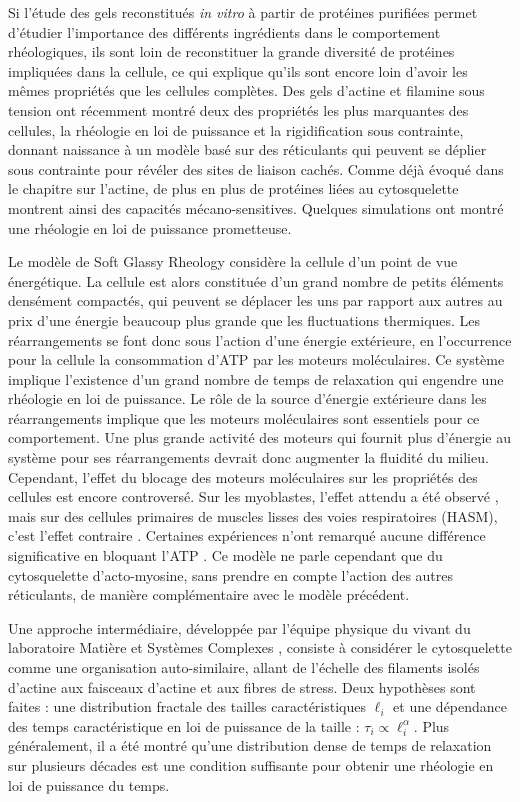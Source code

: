 \documentclass{report}
\begin{document}
Si l'étude des gels reconstitués \textit{in vitro} à partir de protéines purifiées permet d'étudier l'importance des différents ingrédients dans le comportement rhéologiques, ils sont loin de reconstituer la grande diversité de protéines impliquées dans la cellule, ce qui explique qu'ils sont encore loin d'avoir les mêmes propriétés que les cellules complètes. 
Des gels d'actine et filamine sous tension ont récemment montré deux des propriétés les plus marquantes des cellules, la rhéologie en loi de puissance et la rigidification sous contrainte, donnant naissance à un modèle basé sur des réticulants qui peuvent se déplier sous contrainte pour révéler des sites de liaison cachés. Comme déjà évoqué dans le chapitre sur l'actine, de plus en plus de protéines liées au cytosquelette montrent ainsi des capacités mécano-sensitives. Quelques simulations ont montré une rhéologie en loi de puissance prometteuse. 

Le modèle de Soft Glassy Rheology \cite{sollich} considère la cellule d'un point de vue énergétique. 
La cellule est alors constituée d'un grand nombre de petits éléments densément compactés, qui peuvent se déplacer les uns par rapport aux autres au prix d'une énergie beaucoup plus grande que les fluctuations thermiques. 
Les réarrangements se font donc sous l'action d'une énergie extérieure, en l'occurrence pour la cellule la consommation d'ATP par les moteurs moléculaires. 
Ce système implique l'existence d'un grand nombre de temps de relaxation qui engendre une rhéologie en loi de puissance. 
Le rôle de la source d'énergie extérieure dans les réarrangements implique que les moteurs moléculaires sont essentiels pour ce comportement. Une plus grande activité des moteurs qui fournit plus d'énergie au système pour ses réarrangements devrait donc augmenter la fluidité du milieu. 
Cependant, l'effet du blocage des moteurs moléculaires sur les propriétés des cellules est encore controversé. Sur les myoblastes, l'effet attendu a été observé \cite{balland_2005}, mais sur des cellules primaires de muscles lisses des voies respiratoires (HASM), c'est l'effet contraire \cite{fabry}. Certaines expériences n'ont remarqué aucune différence significative en bloquant l'ATP \cite{hoffman}. 
Ce modèle ne parle cependant que du cytosquelette d'acto-myosine, sans prendre en compte l'action des autres réticulants, de manière complémentaire avec le modèle précédent. 

Une approche intermédiaire, développée par l'équipe physique du vivant du laboratoire Matière et Systèmes Complexes \cite{balland_2006}, consiste à considérer le cytosquelette comme une organisation auto-similaire, allant de l'échelle des filaments isolés d'actine aux faisceaux d'actine et aux fibres de stress. Deux hypothèses sont faites : une distribution fractale des tailles caractéristiques $\ell_i$ et une dépendance des temps caractéristique en loi de puissance de la taille : $\tau_i \propto  \ell_i^{\alpha}$. Plus généralement, il a été montré qu'une distribution dense de temps de relaxation sur plusieurs décades est une condition suffisante pour obtenir une rhéologie en loi de puissance du temps. 
 
\end{document}
